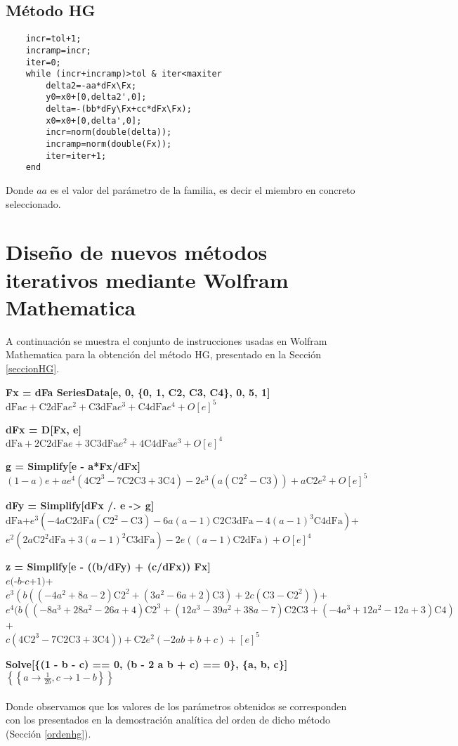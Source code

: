 \section{Método HG}
\begin{lstlisting}
	incr=tol+1;
	incramp=incr;
	iter=0;
	while (incr+incramp)>tol & iter<maxiter
		delta2=-aa*dFx\Fx;
		y0=x0+[0,delta2',0];
		delta=-(bb*dFy\Fx+cc*dFx\Fx);
		x0=x0+[0,delta',0];
		incr=norm(double(delta));
		incramp=norm(double(Fx));
		iter=iter+1;
	end
\end{lstlisting}
Donde $aa$ es el valor del parámetro de la familia, es decir el miembro en concreto seleccionado.
\chapter{Diseño de nuevos métodos iterativos mediante Wolfram Mathematica}
A continuación se muestra el conjunto de instrucciones usadas en Wolfram Mathematica para la obtención del método HG, presentado en la Sección \ref{seccionHG}.

\textbf{Fx = dFa SeriesData[e, 0, \{0, 1,  C2, C3, C4\}, 0, 5, 1]}\\
$\text{dFa} e+\text{C2} \text{dFa} e^2+\text{C3} \text{dFa} e^3+\text{C4} \text{dFa} e^4+O[e]^5$

\textbf{dFx = D[Fx, e]}\\
$\text{dFa}+2 \text{C2} \text{dFa} e+3 \text{C3} \text{dFa} e^2+4 \text{C4} \text{dFa} e^3+O[e]^4$

\textbf{g = Simplify[e - a*Fx/dFx]}\\
$(1-a) e+a e^4 \left(4 \text{C2}^3-7 \text{C2} \text{C3}+3 \text{C4}\right)-2 e^3 \left(a \left(\text{C2}^2-\text{C3}\right)\right)+a \text{C2} e^2+O[e]^5$

\textbf{dFy = Simplify[dFx /. e -> g]}\\
$\text{dFa}$+$e^3 \left(-4 a \text{C2} \text{dFa} \left(\text{C2}^2-\text{C3}\right)-6 a (a-1) \text{C2} \text{C3} \text{dFa}-4 (a-1)^3 \text{C4} \text{dFa}\right)$+\\$e^2 \left(2 a \text{C2}^2 \text{dFa}+3 (a-1)^2 \text{C3} \text{dFa}\right)-2 e ((a-1) \text{C2} \text{dFa})+O[e]^4$

\textbf{z = Simplify[e - ((b/dFy) + (c/dFx)) Fx]}\\
$e ($-$b$-$c$+$1)$+$e^3 \left(b \left(\left(-4 a^2+8 a-2\right) \text{C2}^2+\left(3 a^2-6 a+2\right) \text{C3}\right)+2 c \left(\text{C3}-\text{C2}^2\right)\right)$+\\$e^4 (b \left(\left(-8 a^3+28 a^2-26 a+4\right) \text{C2}^3+\left(12 a^3-39 a^2+38 a-7\right) \text{C2} \text{C3}+\left(-4 a^3+12 a^2-12 a+3\right) \text{C4}\right)$+\\$c \left(4 \text{C2}^3-7 \text{C2} \text{C3}+3 \text{C4}\right))+\text{C2} e^2 (-2 a b+b+c)+[e]^5$

\textbf{Solve[\{(1 - b - c) == 0, (b - 2 a b + c) == 0\}, \{a, b, c\}]}\\
$\left\{\left\{a\to \frac{1}{2 b},c\to 1-b\right\}\right\}$\\\\
Donde observamos que los valores de los parámetros obtenidos se corresponden con los presentados en la demostración analítica del orden de dicho método (Sección \ref{ordenhg}).